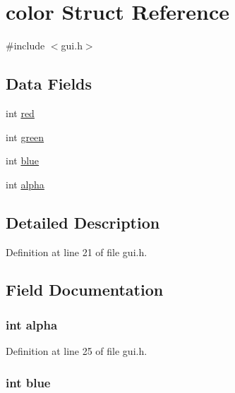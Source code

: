 \hypertarget{structcolor}{\section{color Struct Reference}
\label{structcolor}
}


{\ttfamily \#include $<$gui.\-h$>$}

\subsection*{Data Fields}
\begin{DoxyCompactItemize}
\item 
int \hyperlink{structcolor_a6761340706096510fd89edca40a63b9b}{red}
\item 
int \hyperlink{structcolor_a6e208843f894f38fa7644608917a2a41}{green}
\item 
int \hyperlink{structcolor_a16043f28bf0a6b55db852853f0683fc2}{blue}
\item 
int \hyperlink{structcolor_a98114e5c7c81b3f2003b0a4024bd41f7}{alpha}
\end{DoxyCompactItemize}


\subsection{Detailed Description}


Definition at line 21 of file gui.\-h.



\subsection{Field Documentation}
\hypertarget{structcolor_a98114e5c7c81b3f2003b0a4024bd41f7}{
\subsubsection[{alpha}]{\setlength{\rightskip}{0pt plus 5cm}int alpha}}\label{structcolor_a98114e5c7c81b3f2003b0a4024bd41f7}


Definition at line 25 of file gui.\-h.

\hypertarget{structcolor_a16043f28bf0a6b55db852853f0683fc2}{
\subsubsection[{blue}]{\setlength{\rightskip}{0pt plus 5cm}int blue}}\label{structcolor_a16043f28bf0a6b55db852853f0683fc2}


